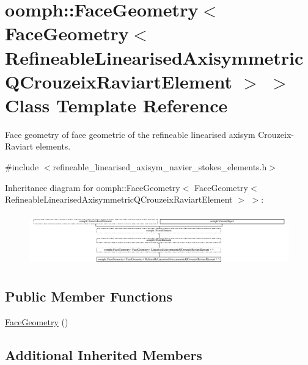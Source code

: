 \hypertarget{classoomph_1_1FaceGeometry_3_01FaceGeometry_3_01RefineableLinearisedAxisymmetricQCrouzeixRaviartElement_01_4_01_4}{}\section{oomph\+:\+:Face\+Geometry$<$ Face\+Geometry$<$ Refineable\+Linearised\+Axisymmetric\+Q\+Crouzeix\+Raviart\+Element $>$ $>$ Class Template Reference}
\label{classoomph_1_1FaceGeometry_3_01FaceGeometry_3_01RefineableLinearisedAxisymmetricQCrouzeixRaviartElement_01_4_01_4}


Face geometry of face geometric of the refineable linearised axisym Crouzeix-\/\+Raviart elements.  




{\ttfamily \#include $<$refineable\+\_\+linearised\+\_\+axisym\+\_\+navier\+\_\+stokes\+\_\+elements.\+h$>$}

Inheritance diagram for oomph\+:\+:Face\+Geometry$<$ Face\+Geometry$<$ Refineable\+Linearised\+Axisymmetric\+Q\+Crouzeix\+Raviart\+Element $>$ $>$\+:\begin{figure}[H]
\begin{center}
\leavevmode
\includegraphics[height=2.280130cm]{classoomph_1_1FaceGeometry_3_01FaceGeometry_3_01RefineableLinearisedAxisymmetricQCrouzeixRaviartElement_01_4_01_4}
\end{center}
\end{figure}
\subsection*{Public Member Functions}
\begin{DoxyCompactItemize}
\item 
\hyperlink{classoomph_1_1FaceGeometry_3_01FaceGeometry_3_01RefineableLinearisedAxisymmetricQCrouzeixRaviartElement_01_4_01_4_a1e4a101eebd38872c953e9b714513387}{Face\+Geometry} ()
\end{DoxyCompactItemize}
\subsection*{Additional Inherited Members}


